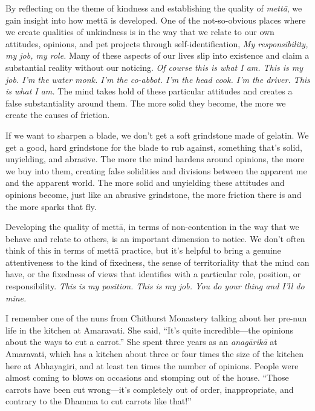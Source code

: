 
By reflecting on the theme of kindness and establishing the quality of 
\emph{mettā}, we gain insight into how mettā is developed. One of the 
not-so-obvious places where we create qualities of unkindness is in the 
way that we relate to our own attitudes, opinions, and pet projects 
through self-identification, \emph{My responsibility, my job, my role.} 
Many of these aspects of our lives slip into existence and claim a 
substantial reality without our noticing. \emph{Of course this is what 
I am. This is my job. I'm the water monk. I'm the co-abbot. I'm the 
head cook. I'm the driver. This is what I am.} The mind takes hold of 
these particular attitudes and creates a false substantiality around 
them. The more solid they become, the more we create the causes of 
friction.

If we want to sharpen a blade, we don't get a soft grindstone made of 
gelatin. We get a good, hard grindstone for the blade to rub against, 
something that's solid, unyielding, and abrasive. The more the mind 
hardens around opinions, the more we buy into them, creating false 
solidities and divisions between the apparent me and the apparent 
world. The more solid and unyielding these attitudes and opinions 
become, just like an abrasive grindstone, the more friction there is 
and the more sparks that fly.

Developing the quality of mettā, in terms of non-contention in the way 
that we behave and relate to others, is an important dimension to 
notice. We don't often think of this in terms of mettā practice, but 
it's helpful to bring a genuine attentiveness to the kind of fixedness, 
the sense of territoriality that the mind can have, or the fixedness of 
views that identifies with a particular role, position, or 
responsibility. \emph{This is my position. This is my job. You do your 
thing and I'll do mine.}

I remember one of the nuns from Chithurst Monastery talking about her 
pre-nun life in the kitchen at Amaravati. She said, ``It's quite 
incredible---the opinions about the ways to cut a carrot.'' She spent 
three years as an \emph{anagārikā} at Amaravati, which has a kitchen 
about three or four times the size of the kitchen here at Abhayagiri, 
and at least ten times the number of opinions. People were almost 
coming to blows on occasions and stomping out of the house. ``Those 
carrots have been cut wrong---it's completely out of order, 
inappropriate, and contrary to the Dhamma to cut carrots like that!''

